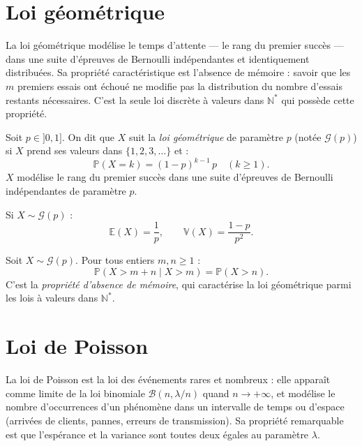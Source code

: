 \documentclass[11pt,a4paper,twoside]{book}
\begin{document}
\section{Loi géométrique}

La loi géométrique modélise le temps d'attente — le rang du premier succès — dans une suite d'épreuves de Bernoulli indépendantes et identiquement distribuées. Sa propriété caractéristique est l'absence de mémoire : savoir que les $m$ premiers essais ont échoué ne modifie pas la distribution du nombre d'essais restants nécessaires. C'est la seule loi discrète à valeurs dans $\mathbb{N}^*$ qui possède cette propriété.

\begin{definitionbox}
Soit $p \in {]0,1]}$. On dit que $X$ suit la \emph{loi géométrique} de paramètre $p$
(notée $\mathcal{G}(p)$) si $X$ prend ses valeurs dans $\{1, 2, 3, \ldots\}$ et :
\[
  \mathbb{P}(X = k) = (1-p)^{k-1}\, p \quad (k \geq 1).
\]
$X$ modélise le rang du premier succès dans une suite d'épreuves de Bernoulli indépendantes
de paramètre $p$.
\end{definitionbox}

\begin{theoremebox}
Si $X \sim \mathcal{G}(p)$ :
\[
  \mathbb{E}(X) = \frac{1}{p}, \qquad \mathbb{V}(X) = \frac{1-p}{p^2}.
\]
\end{theoremebox}

\begin{theoremebox}
Soit $X \sim \mathcal{G}(p)$. Pour tous entiers $m, n \geq 1$ :
\[
  \mathbb{P}(X > m+n \mid X > m) = \mathbb{P}(X > n).
\]
C'est la \emph{propriété d'absence de mémoire}, qui caractérise la loi géométrique
parmi les lois à valeurs dans $\mathbb{N}^*$.
\end{theoremebox}

\section{Loi de Poisson}

La loi de Poisson est la loi des événements rares et nombreux : elle apparaît comme limite de la loi binomiale $\mathcal{B}(n, \lambda/n)$ quand $n \to +\infty$, et modélise le nombre d'occurrences d'un phénomène dans un intervalle de temps ou d'espace (arrivées de clients, pannes, erreurs de transmission). Sa propriété remarquable est que l'espérance et la variance sont toutes deux égales au paramètre $\lambda$.
\end{document}
